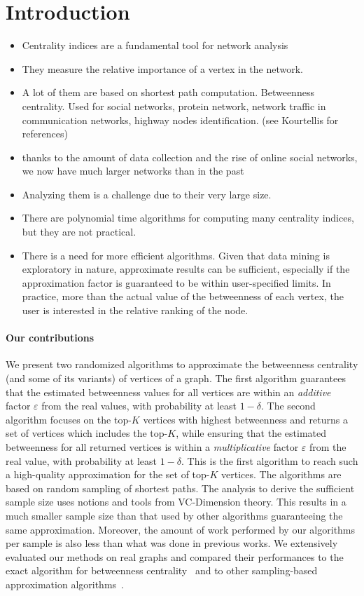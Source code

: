 \section{Introduction}\label{sec:intro}
\begin{itemize}
  \item Centrality indices are a fundamental tool for network analysis
  \item They measure the relative importance of a vertex in the network.
  \item A lot of them are based on shortest path computation. Betweenness
    centrality. Used for social networks, protein network, network traffic in
    communication networks, highway nodes identification. (see Kourtellis for references)
  \item thanks to the amount of data collection and the rise of online social
    networks, we now have much larger networks than in the past
  \item Analyzing them is a challenge due to their very large size.
  \item There are polynomial time algorithms for computing many centrality
    indices, but they are not practical. 
  \item There is a need for more efficient algorithms. Given that data mining is
    exploratory in nature, approximate results can be sufficient, especially if
    the approximation factor is guaranteed to be within user-specified limits.
    In practice, more than the actual value of the betweenness of each vertex,
    the user is interested in the relative ranking of the node.
\end{itemize}

\paragraph{Our contributions} 
We present two randomized algorithms to approximate the betweenness centrality
(and some of its variants) of vertices of a graph. The first algorithm
guarantees that the estimated betweenness values for all vertices are within an
\emph{additive} factor $\varepsilon$ from the real values, with probability at
least $1-\delta$. The second algorithm focuses on the top-$K$ vertices with
highest betweenness and returns a set of vertices which includes the top-$K$,
while ensuring that the estimated betweenness for all returned vertices is
within a \emph{multiplicative} factor $\varepsilon$ from the real value, with
probability at least $1-\delta$. This is the first algorithm to reach such a
high-quality approximation for the set of top-$K$ vertices. The algorithms are
based on random sampling of shortest paths. The analysis to derive the
sufficient sample size uses notions and tools from VC-Dimension theory. This
results in a much smaller sample size than that used by other algorithms
guaranteeing the same approximation. Moreover, the amount of work performed by
our algorithms per sample is also less than what was done in previous works.
We extensively evaluated our methods on real graphs and compared their
performances to the exact algorithm for betweenness
centrality~\citep{Brandes01} and to other sampling-based approximation
algorithms~\citep{JacobKLPT05,BrandesP07}.

